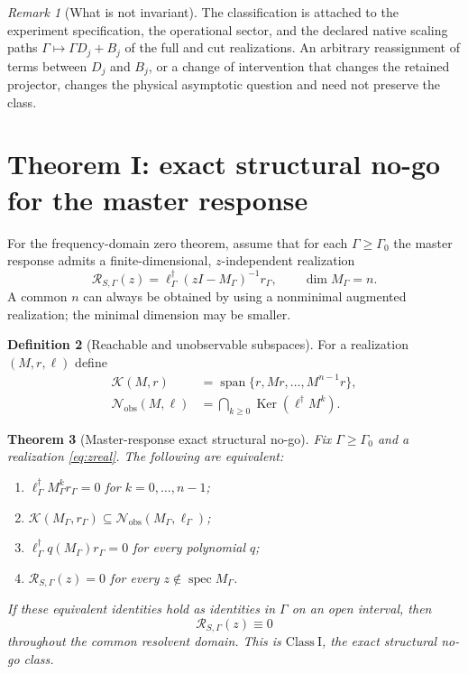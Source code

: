 \documentclass[11pt]{article}
\newtheorem{theorem}{Theorem}[section]
\theoremstyle{definition}
\newtheorem{definition}[theorem]{Definition}
\theoremstyle{remark}
\newtheorem{remark}[theorem]{Remark}
\theoremstyle{plain}
\newcommand{\K}{\mathcal K}
\newcommand{\R}{\mathcal R}
\newcommand{\spec}{\operatorname{spec}}
\newcommand{\Ker}{\operatorname{Ker}}
\newcommand{\Span}{\operatorname{span}}
\newcommand{\ClassI}{\ensuremath{\mathrm{Class\ I}}}
\begin{document}
\begin{remark}[What is not invariant]
The classification is attached to the experiment specification, the operational sector, and the declared native scaling paths $\Gamma\mapsto\Gamma D_j+B_j$ of the full and cut realizations.  An arbitrary reassignment of terms between $D_j$ and $B_j$, or a change of intervention that changes the retained projector, changes the physical asymptotic question and need not preserve the class.
\end{remark}

\section{Theorem I: exact structural no-go for the master response}

For the frequency-domain zero theorem, assume that for each $\Gamma\ge\Gamma_0$ the master response admits a finite-dimensional, $z$-independent realization
\begin{equation}\label{eq:zreal}
 \R_{S,\Gamma}(z)=\ell_\Gamma^\dagger(zI-M_\Gamma)^{-1}r_\Gamma,
 \qquad \dim M_\Gamma=n.
\end{equation}
A common $n$ can always be obtained by using a nonminimal augmented realization; the minimal dimension may be smaller.

\begin{definition}[Reachable and unobservable subspaces]
For a realization $(M,r,\ell)$ define
\begin{align}
 \K(M,r)&=\Span\{r,Mr,\ldots,M^{n-1}r\},\\
 \mathcal N_{\mathrm{obs}}(M,\ell)
 &=\bigcap_{k\ge0}\Ker(\ell^\dagger M^k).
\end{align}
\end{definition}

\begin{theorem}[Master-response exact structural no-go]\label{thm:exact}
Fix $\Gamma\ge\Gamma_0$ and a realization \eqref{eq:zreal}.  The following are equivalent:
\begin{enumerate}[label=(\roman*)]
 \item $\ell_\Gamma^\dagger M_\Gamma^k r_\Gamma=0$ for $k=0,\ldots,n-1$;
 \item $\K(M_\Gamma,r_\Gamma)\subseteq\mathcal N_{\mathrm{obs}}(M_\Gamma,\ell_\Gamma)$;
 \item $\ell_\Gamma^\dagger q(M_\Gamma)r_\Gamma=0$ for every polynomial $q$;
 \item $\R_{S,\Gamma}(z)=0$ for every $z\notin\spec M_\Gamma$.
\end{enumerate}
If these equivalent identities hold as identities in $\Gamma$ on an open interval, then
\begin{equation}\label{eq:classI}
 \R_{S,\Gamma}(z)\equiv0
\end{equation}
throughout the common resolvent domain.  This is \ClassI, the exact structural no-go class.
\end{theorem}
\end{document}

